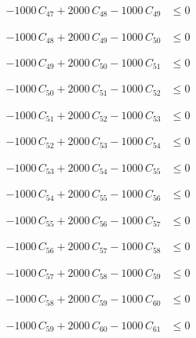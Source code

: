 \documentclass[a4paper,11pt]{article}
\begin{document}
\begin{align}
-1000\,C_{47} + 2000\,C_{48} - 1000\,C_{49} &\leq 0 \nonumber
\end{align}

\begin{align}
-1000\,C_{48} + 2000\,C_{49} - 1000\,C_{50} &\leq 0 \nonumber
\end{align}

\begin{align}
-1000\,C_{49} + 2000\,C_{50} - 1000\,C_{51} &\leq 0 \nonumber
\end{align}

\begin{align}
-1000\,C_{50} + 2000\,C_{51} - 1000\,C_{52} &\leq 0 \nonumber
\end{align}

\begin{align}
-1000\,C_{51} + 2000\,C_{52} - 1000\,C_{53} &\leq 0 \nonumber
\end{align}

\begin{align}
-1000\,C_{52} + 2000\,C_{53} - 1000\,C_{54} &\leq 0 \nonumber
\end{align}

\begin{align}
-1000\,C_{53} + 2000\,C_{54} - 1000\,C_{55} &\leq 0 \nonumber
\end{align}

\begin{align}
-1000\,C_{54} + 2000\,C_{55} - 1000\,C_{56} &\leq 0 \nonumber
\end{align}

\begin{align}
-1000\,C_{55} + 2000\,C_{56} - 1000\,C_{57} &\leq 0 \nonumber
\end{align}

\begin{align}
-1000\,C_{56} + 2000\,C_{57} - 1000\,C_{58} &\leq 0 \nonumber
\end{align}

\begin{align}
-1000\,C_{57} + 2000\,C_{58} - 1000\,C_{59} &\leq 0 \nonumber
\end{align}

\begin{align}
-1000\,C_{58} + 2000\,C_{59} - 1000\,C_{60} &\leq 0 \nonumber
\end{align}

\begin{align}
-1000\,C_{59} + 2000\,C_{60} - 1000\,C_{61} &\leq 0 \nonumber
\end{align}
\end{document}

